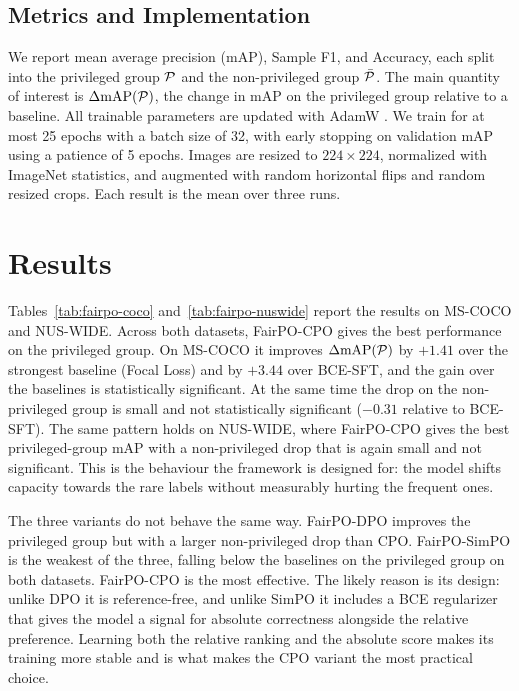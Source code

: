 \subsection{Metrics and Implementation}
\label{subsec:fairpo-impl}

We report mean average precision (mAP), Sample F1, and Accuracy, each split into the
privileged group $\mathcal{P}$ and the non-privileged group $\bar{\mathcal{P}}$. The
main quantity of interest is $\Delta\text{mAP}(\mathcal{P})$, the change in mAP on
the privileged group relative to a baseline. All trainable parameters are updated
with AdamW \citep{loshchilov2019decoupled}. We train for at
most 25 epochs with a batch size of 32, with early stopping on validation mAP using
a patience of 5 epochs. Images are resized to $224 \times 224$, normalized with
ImageNet statistics, and augmented with random horizontal flips and random resized
crops. Each result is the mean over three runs.

\section{Results}
\label{sec:fairpo-results}

Tables~\ref{tab:fairpo-coco} and~\ref{tab:fairpo-nuswide} report the results on
MS-COCO and NUS-WIDE. Across both datasets, FairPO-CPO gives the best performance on
the privileged group. On MS-COCO it improves $\Delta\text{mAP}(\mathcal{P})$ by
$+1.41$ over the strongest baseline (Focal Loss) and by $+3.44$ over BCE-SFT, and
the gain over the baselines is statistically significant. At the same time the drop
on the non-privileged group is small and not statistically significant
($-0.31$ relative to BCE-SFT). The same pattern holds on NUS-WIDE, where FairPO-CPO
gives the best privileged-group mAP with a non-privileged drop that is again small
and not significant. This is the behaviour the framework is designed for: the model
shifts capacity towards the rare labels without measurably hurting the frequent
ones.

The three variants do not behave the same way. FairPO-DPO improves the privileged
group but with a larger non-privileged drop than CPO. FairPO-SimPO is the weakest of
the three, falling below the baselines on the privileged group on both datasets.
FairPO-CPO is the most effective. The likely reason is its design: unlike DPO it is
reference-free, and unlike SimPO it includes a BCE regularizer that gives the model
a signal for absolute correctness alongside the relative preference. Learning both
the relative ranking and the absolute score makes its training more stable and is
what makes the CPO variant the most practical choice.

